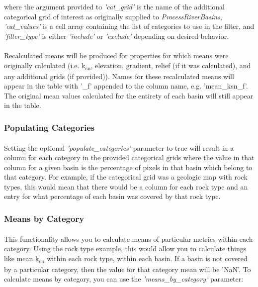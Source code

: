 \noindent
where the argument provided to \textit{'cat\_grid'} is the name of the additional categorical grid of interest as originally supplied to \textit{ProcessRiverBasins}, \textit{'cat\_values'} is a cell array containing the list of categories to use in the filter, and \textit{'filter\_type'} is either \textit{'include'} or \textit{'exclude'} depending on desired behavior.

\paragraph{}Recalculated means will be produced for properties for which means were originally calculated (i.e. k\textsubscript{sn}, elevation, gradient, relief (if it was calculated), and any additional grids (if provided)). Names for these recalculated means will appear in the table with '\_f' appended to the column name, e.g. 'mean\_ksn\_f'. The original mean values calculated for the entirety of each basin will still appear in the table.

\subsubsection{Populating Categories}
\paragraph{}Setting the optional \textit{'populate\_categories'} parameter to true will result in a column for each category in the provided categorical grids where the value in that column for a given basin is the percentage of pixels in that basin which belong to that category. For example, if the categorical grid was a geologic map with rock types, this would mean that there would be a column for each rock type and an entry for what percentage of each basin was covered by that rock type.

\subsubsection{Means by Category}
\paragraph{}This functionality allows you to calculate means of particular metrics within each category. Using the rock type example, this would allow you to calculate things like mean k\textsubscript{sn} within each rock type, within each basin. If a basin is not covered by a particular category, then the value for that category mean will be 'NaN'. To calculate means by category, you can use the \textit{'means\_by\_category'} parameter:

